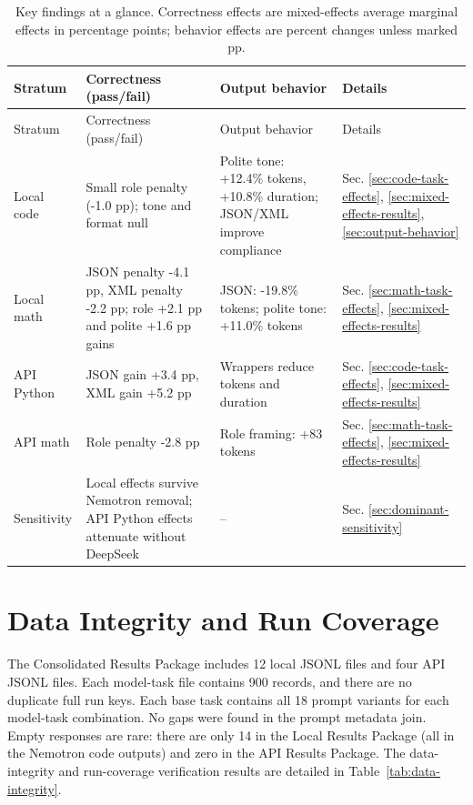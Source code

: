 \begin{longtable}[]{@{}
 >{\raggedright\arraybackslash}p{}
 >{\raggedright\arraybackslash}p{}
 >{\raggedright\arraybackslash}p{}
 >{\raggedright\arraybackslash}p{}@{}}
\caption{Key findings at a glance. Correctness effects are mixed-effects average marginal effects in percentage points; behavior effects are percent changes unless marked pp.}\label{tab:key-findings}\tabularnewline
\toprule\noalign{}
Stratum & Correctness (pass/fail) & Output behavior & Details \\
\midrule\noalign{}
\endfirsthead
\toprule\noalign{}
Stratum & Correctness (pass/fail) & Output behavior & Details \\
\midrule\noalign{}
\endhead
\bottomrule\noalign{}
\endlastfoot
Local code & Small role penalty (-1.0 pp); tone and format null & Polite tone: +12.4\% tokens, +10.8\% duration; JSON/XML improve compliance & Sec. \ref{sec:code-task-effects}, \ref{sec:mixed-effects-results}, \ref{sec:output-behavior} \\
Local math & JSON penalty -4.1 pp, XML penalty -2.2 pp; role +2.1 pp and polite +1.6 pp gains & JSON: -19.8\% tokens; polite tone: +11.0\% tokens & Sec. \ref{sec:math-task-effects}, \ref{sec:mixed-effects-results} \\
API Python & JSON gain +3.4 pp, XML gain +5.2 pp & Wrappers reduce tokens and duration & Sec. \ref{sec:code-task-effects}, \ref{sec:mixed-effects-results} \\
API math & Role penalty -2.8 pp & Role framing: +83 tokens & Sec. \ref{sec:math-task-effects}, \ref{sec:mixed-effects-results} \\
Sensitivity & Local effects survive Nemotron removal; API Python effects attenuate without DeepSeek & -- & Sec. \ref{sec:dominant-sensitivity} \\
\end{longtable}

\section{Data Integrity and Run Coverage\label{sec:data-integrity}}

The Consolidated Results Package includes 12 local JSONL files and four API JSONL files. Each model-task file contains 900 records, and there are no duplicate full run keys. Each base task contains all 18 prompt variants for each model-task combination. No gaps were found in the prompt metadata join. Empty responses are rare: there are only 14 in the Local Results Package (all in the Nemotron code outputs) and zero in the API Results Package. The data-integrity and run-coverage verification results are detailed in Table~\ref{tab:data-integrity}.

